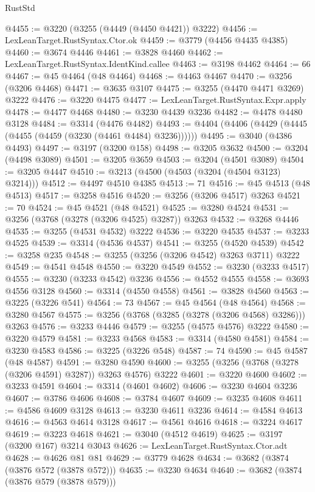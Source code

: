 \begin{lexlean}{RustStd}
\begin{coremodule}
{\begin{coremodule}
{{{{{{{{{{{{{{{{{{{{{{{{{{{{{{{{{{{{{@4455 := @3220 (@3255 (@4449 (@4450 @4421)) @3222)
@4456 := LexLeanTarget.RustSyntax.Ctor.ok
@4459 := @3779 (@4456 @4435 @4385)
@4460 := @3674 @4446
@4461 := @3828 @4460
@4462 := LexLeanTarget.RustSyntax.IdentKind.callee
@4463 := @3198 @4462
@4464 := 66
@4467 := @45 @4464 (@48 @4464)
@4468 := @4463 @4467
@4470 := @3256 (@3206 @4468)
@4471 := @3635 @3107
@4475 := @3255 (@4470 @4471 @3269) @3222
@4476 := @3220 @4475
@4477 := LexLeanTarget.RustSyntax.Expr.apply
@4478 := @4477 @4468
@4480 := @3230 @4439 @3236
@4482 := @4478 @4480 @3128
@4484 := @3314 (@4476 @4482)
@4493 := @4404 (@4406 (@4429 (@4445 (@4455 (@4459 (@3230 (@4461 @4484) @3236))))))
@4495 := @3040 (@4386 @4493)
@4497 := @3197 (@3200 @158)
@4498 := @3205 @3632
@4500 := @3204 (@4498 @3089)
@4501 := @3205 @3659
@4503 := @3204 (@4501 @3089)
@4504 := @3205 @4447
@4510 := @3213 (@4500 (@4503 (@3204 (@4504 @3123) @3214)))
@4512 := @4497 @4510 @4385
@4513 := 71
@4516 := @45 @4513 (@48 @4513)
@4517 := @3258 @4516
@4520 := @3256 (@3206 @4517) @3263
@4521 := 70
@4524 := @45 @4521 (@48 @4521)
@4525 := @3280 @4524
@4531 := @3256 (@3768 (@3278 (@3206 @4525) @3287)) @3263
@4532 := @3268 @4446
@4535 := @3255 (@4531 @4532) @3222
@4536 := @3220 @4535
@4537 := @3233 @4525
@4539 := @3314 (@4536 @4537)
@4541 := @3255 (@4520 @4539)
@4542 := @3258 @235
@4548 := @3255 (@3256 (@3206 @4542) @3263 @3711) @3222
@4549 := @4541 @4548
@4550 := @3220 @4549
@4552 := @3230 (@3233 @4517)
@4555 := @3230 (@3233 @4542) @3236
@4556 := @4552 @4555
@4558 := @3693 @4556 @3128
@4560 := @3314 (@4550 @4558)
@4561 := @3828 @4560
@4563 := @3225 (@3226 @541)
@4564 := 73
@4567 := @45 @4564 (@48 @4564)
@4568 := @3280 @4567
@4575 := @3256 (@3768 (@3285 (@3278 (@3206 @4568) @3286))) @3263
@4576 := @3233 @4446
@4579 := @3255 (@4575 @4576) @3222
@4580 := @3220 @4579
@4581 := @3233 @4568
@4583 := @3314 (@4580 @4581)
@4584 := @3230 @4583
@4586 := @3225 (@3226 @548)
@4587 := 74
@4590 := @45 @4587 (@48 @4587)
@4591 := @3280 @4590
@4600 := @3255 (@3256 (@3768 (@3278 (@3206 @4591) @3287)) @3263 @4576) @3222
@4601 := @3220 @4600
@4602 := @3233 @4591
@4604 := @3314 (@4601 @4602)
@4606 := @3230 @4604 @3236
@4607 := @3786 @4606
@4608 := @3784 @4607
@4609 := @3235 @4608
@4611 := @4586 @4609 @3128
@4613 := @3230 @4611 @3236
@4614 := @4584 @4613
@4616 := @4563 @4614 @3128
@4617 := @4561 @4616
@4618 := @3224 @4617
@4619 := @3223 @4618
@4621 := @3040 (@4512 @4619)
@4625 := @3197 (@3200 @167) @3214 @3043
@4626 := LexLeanTarget.RustSyntax.Ctor.adt
@4628 := @4626 @81 @81
@4629 := @3779 @4628
@4634 := @3682 (@3874 (@3876 @572 (@3878 @572)))
@4635 := @3230 @4634
@4640 := @3682 (@3874 (@3876 @579 (@3878 @579)))
}}}}}}}}}}}}}}}}}}}}}}}}}}}}}}}}}}}}}
\end{coremodule}}
\end{coremodule}
\end{lexlean}
